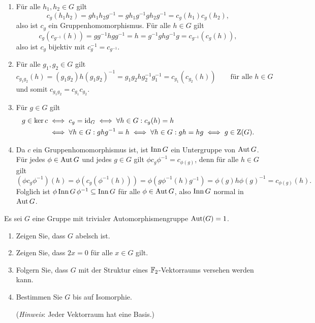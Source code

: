 \begin{solution}
  \begin{enumerate}
    \item
      Für alle $h_1, h_2 \in G$ gilt
      \[
          c_g(h_1 h_2)
        = g h_1 h_2 g^{-1}
        = g h_1 g^{-1} g h_2 g^{-1}
        = c_g(h_1) c_g(h_2),
      \]
      also ist $c_g$ ein Gruppenhomomorphismus.
      Für alle $h \in G$ gilt
      \[
          c_g( c_{g^{-1}}(h) )
        = g g^{-1} h g g^{-1}
        = h
        = g^{-1} g h g^{-1} g
        = c_{g^{-1}}( c_g(h) ),
      \]
      also ist $c_g$ bijektiv mit $c_g^{-1} = c_{g^{-1}}$.
    \item
      Für alle $g_1, g_2 \in G$ gilt
      \[
          c_{g_1 g_2}(h)
        = (g_1 g_2) h (g_1 g_2)^{-1}
        = g_1 g_2 h g_2^{-1} g_1^{-1}
        = c_{g_1}( c_{g_2}(h) )
        \qquad
        \text{für alle $h \in G$}
      \]
      und somit $c_{g_1 g_2} = c_{g_1} c_{g_2}$.
    \item
      Für $g \in G$ gilt
      \begin{align*}
              g \in \ker c
        &\iff c_g = \operatorname{id}_G
         \iff \forall h \in G: c_g(h) = h
        \\
        &\iff \forall h \in G: ghg^{-1} = h
         \iff \forall h \in G: gh = hg
         \iff g \in \operatorname{Z}(G).
      \end{align*}
    \item
      Da $c$ ein Gruppenhomomorphismus ist, ist $\operatorname{Inn} G$ ein Untergruppe von $\operatorname{Aut} G$.
      Für jedes $\phi \in \operatorname{Aut} G$ und jedes $g \in G$ gilt $\phi c_g \phi^{-1} = c_{\phi(g)}$, denn für alle $h \in G$ gilt
      \[
        (\phi c_g \phi^{-1})(h)
        = \phi( c_g( \phi^{-1}(h) ) )
        = \phi(g \phi^{-1}(h) g^{-1})
        = \phi(g) h \phi(g)^{-1}
        = c_{\phi(g)}(h).
      \]
      Folglich ist $\phi \, {\operatorname{Inn} G} \, \phi^{-1} \subseteq \operatorname{Inn} G$ für alle $\phi \in \operatorname{Aut} G$, also $\operatorname{Inn} G$ normal in $\operatorname{Aut} G$.
  \end{enumerate}
\end{solution}


\begin{question}[subtitle = Gruppen mit trivialer Automorphismengruppe]
  Es sei $G$ eine Gruppe mit trivialer Automorphismengruppe $\operatorname{Aut}(G) = 1$.
  \begin{enumerate}
    \item
      Zeigen Sie, dass $G$ abelsch ist.
    \item
      Zeigen Sie, dass $2x = 0$ für alle $x \in G$ gilt.
    \item
      Folgern Sie, dass $G$ mit der Struktur eines $\mathbb{F}_2$-Vektorraums versehen werden kann.
    \item
      Bestimmen Sie $G$ bis auf Isomorphie.
      
      (\emph{Hinweis}: Jeder Vektorraum hat eine Basis.)
  \end{enumerate}
\end{question}


